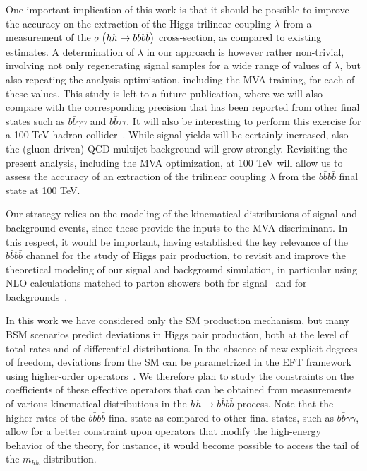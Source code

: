 One important implication of this work is that it should
be possible to improve  the accuracy on the extraction of
the Higgs trilinear coupling $\lambda$ from
a measurement of the
$\sigma\left( hh\to b\bar{b}b\bar{b}\right)$ cross-section, as compared
to existing estimates.
%
A determination of $\lambda$ in our approach is however
rather
non-trivial, involving
 not only regenerating signal samples
 for a wide range of values of  $\lambda$, but also
 repeating the analysis
optimisation, including the MVA training, for each
of these values.
%
This study is left to a future
publication, where we will also
compare with the corresponding  precision 
that has been reported from other final states such as
 $b\bar{b}\gamma\gamma$
and $b\bar{b}\tau\tau$.
%
It will also be  interesting to perform
this exercise for a 100 TeV hadron collider~\cite{Barr:2014sga,
  Azatov:2015oxa,Papaefstathiou:2015iba,
  Arkani-Hamed:2015vfh}.
%
While signal yields will be certainly increased, also the (gluon-driven) QCD
multijet background will grow strongly.
%
Revisiting
the present analysis, including the MVA optimization,
at 100 TeV will allow us
to assess the accuracy of an extraction of the trilinear
coupling $\lambda$ from the $b\bar{b}b\bar{b}$ final state
at 100 TeV.


Our strategy relies on the modeling of the kinematical
distributions of signal and background events, since these provide
the inputs to the MVA discriminant.
%
In this respect, it would be important, having established the key
relevance of the $b\bar{b}b\bar{b}$ channel for the study of
Higgs pair production, to revisit and improve the
theoretical modeling of our signal and background simulation,
in particular using NLO calculations matched to
parton showers both for signal~\cite{Frederix:2014hta,Maierhofer:2013sha}
and for backgrounds~\cite{Alwall:2014hca,Gleisberg:2008ta}.
%

In this work we have considered only the SM production mechanism,
but many BSM scenarios predict deviations
in Higgs pair production, both at the level of total rates
and of
differential distributions.
%
In the absence of new explicit degrees of freedom,
deviations from the SM can be parametrized in
the EFT framework using higher-order
operators~\cite{Azatov:2015oxa,Goertz:2014qta}.
%
We therefore plan to study the constraints
on the coefficients of these effective
operators that can be obtained from measurements
of various kinematical distributions
in the $hh\to b\bar{b}b\bar{b}$ process.
%
Note that the higher rates of the $b\bar{b}b\bar{b}$ final state as compared to
other final states, such as
$b\bar{b}\gamma\gamma$, allow for a better constraint upon operators
that modify the high-energy behavior
of the theory, for instance,
it would become possible
to access the tail of the $m_{hh}$ distribution.


